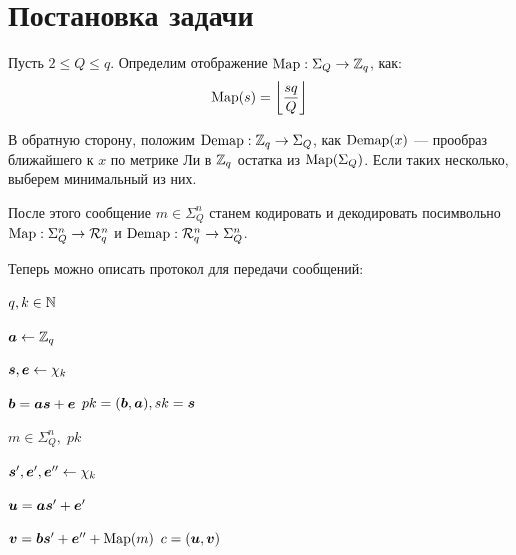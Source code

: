 \section{Постановка задачи}
\label{sec:Chapter2} 


Пусть $2 \leq Q \leq q$. Определим отображение $\Map: \Sigma_Q \to \Z_q$, как:
\begin{equation}
	\Map(s) = \left\lfloor\frac{sq}{Q}\right\rfloor
\end{equation}

В обратную сторону, положим $\Demap: \Z_q \to \Sigma_Q$, как $\Demap(x)$ --- прообраз ближайшего к $x$ по метрике Ли в $\Z_q$ остатка из $\Map(\Sigma_Q)$. Если таких несколько, выберем минимальный из них.

После этого сообщение $m \in \Sigma_Q^n$ станем кодировать и декодировать посимвольно $\Map: \Sigma_Q^n \to \mathcal{R}_q^n$ и $\Demap: \mathcal{R}_q^n \to \Sigma_Q^n$.

Теперь можно описать протокол для передачи сообщений:

\begin{algorithm}
	\caption{Генерация ключей}
	\begin{algorithmic}
		\Require $q, k \in \N$
		\item $\bold a \leftarrow \Z_q$
		\item $\bold s, \bold e \leftarrow \chi_k$
		\item $\bold b = \bold a\bold s+\bold e$
		\Ensure $pk = (\bold b, \bold a), sk = \bold s$
	\end{algorithmic}
\end{algorithm}

\begin{algorithm}
	\caption{Зашифрование}
	\begin{algorithmic}
		\Require $m \in \Sigma_Q^n, \; pk$
		\item $\bold{s'}, \bold{e'}, \bold{e''} \leftarrow \chi_k$
		\item $\bold u = \bold a\bold{s'}+\bold{e'}$
		\item $\bold v = \bold b\bold{s'}+\bold{e''}+\Map(m)$
		\Ensure $c = (\bold u, \bold v)$
	\end{algorithmic}
\end{algorithm}


